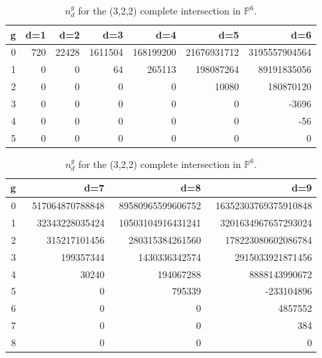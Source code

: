 \documentclass[12pt]{article}
\begin{document}
\begin{table}
\begin{centering}
\begin{tabular}{|r|rrrrrr|}
\hline
g &d=1 &d=2 &d=3 &d=4 &d=5 &d=6\\
\hline
0& 720& 22428& 1611504& 168199200& 21676931712& 3195557904564  \\
1& 0& 0& 64& 265113& 198087264& 89191835056\\
2& 0& 0& 0& 0& 10080& 180870120\\
3& 0& 0& 0& 0& 0& -3696  \\
4& 0& 0& 0& 0& 0& -56 \\
5& 0& 0& 0& 0& 0& 0 \\
\hline
\end{tabular}
\begin{tabular}{|r|rrr|}
\hline
g &d=7 &d=8 &d=9\\
\hline
0& \,\, 517064870788848& \, 89580965599606752& \, 16352303769375910848  \\
1& 32343228035424&10503104916431241& 3201634967657293024 \\
2& 315217101456& 280315384261560& 178223080602086784 \\
3& 199357344& 1430336342574& 2915033921871456 \\
4& 30240& 194067288& 8888143990672 \\
5& 0& 795339& -233104896  \\
6& 0& 0& 4857552 \\
7& 0& 0& 384 \\
8& 0& 0&  0\\
\hline
\end{tabular}
\caption{$n^g_d$ for the (3,2,2) complete intersection in $\mathbb{P}^6$.}
\end{centering}
\end{table}
\end{document}
